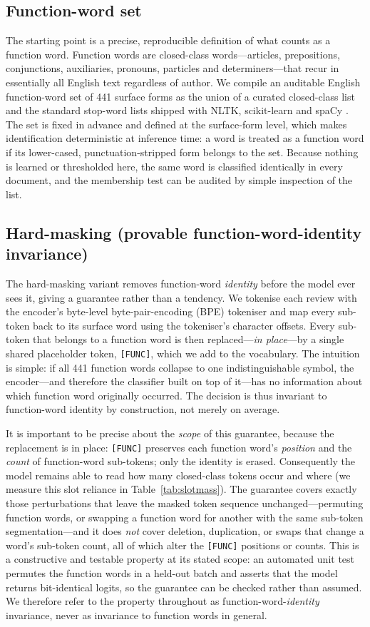 \documentclass[10pt,twocolumn]{article}
\begin{document}
\subsection{Function-word set}
The starting point is a precise, reproducible definition of what counts as a function word. Function words are closed-class words---articles, prepositions, conjunctions, auxiliaries, pronouns, particles and determiners---that recur in essentially all English text regardless of author. We compile an auditable English function-word set of 441 surface forms as the union of a curated closed-class list and the standard stop-word lists shipped with NLTK, scikit-learn and spaCy \cite{spacy}. The set is fixed in advance and defined at the surface-form level, which makes identification deterministic at inference time: a word is treated as a function word if its lower-cased, punctuation-stripped form belongs to the set. Because nothing is learned or thresholded here, the same word is classified identically in every document, and the membership test can be audited by simple inspection of the list.
\subsection{Hard-masking (provable function-word-identity invariance)}
The hard-masking variant removes function-word \emph{identity} before the model ever sees it, giving a guarantee rather than a tendency. We tokenise each review with the encoder's byte-level byte-pair-encoding (BPE) tokeniser and map every sub-token back to its surface word using the tokeniser's character offsets. Every sub-token that belongs to a function word is then replaced---\emph{in place}---by a single shared placeholder token, \texttt{[FUNC]}, which we add to the vocabulary. The intuition is simple: if all 441 function words collapse to one indistinguishable symbol, the encoder---and therefore the classifier built on top of it---has no information about which function word originally occurred. The decision is thus invariant to function-word identity by construction, not merely on average.

It is important to be precise about the \emph{scope} of this guarantee, because the replacement is in place: \texttt{[FUNC]} preserves each function word's \emph{position} and the \emph{count} of function-word sub-tokens; only the identity is erased. Consequently the model remains able to read how many closed-class tokens occur and where (we measure this slot reliance in Table~\ref{tab:slotmass}). The guarantee covers exactly those perturbations that leave the masked token sequence unchanged---permuting function words, or swapping a function word for another with the same sub-token segmentation---and it does \emph{not} cover deletion, duplication, or swaps that change a word's sub-token count, all of which alter the \texttt{[FUNC]} positions or counts. This is a constructive and testable property at its stated scope: an automated unit test permutes the function words in a held-out batch and asserts that the model returns bit-identical logits, so the guarantee can be checked rather than assumed. We therefore refer to the property throughout as function-word-\emph{identity} invariance, never as invariance to function words in general.
\end{document}
